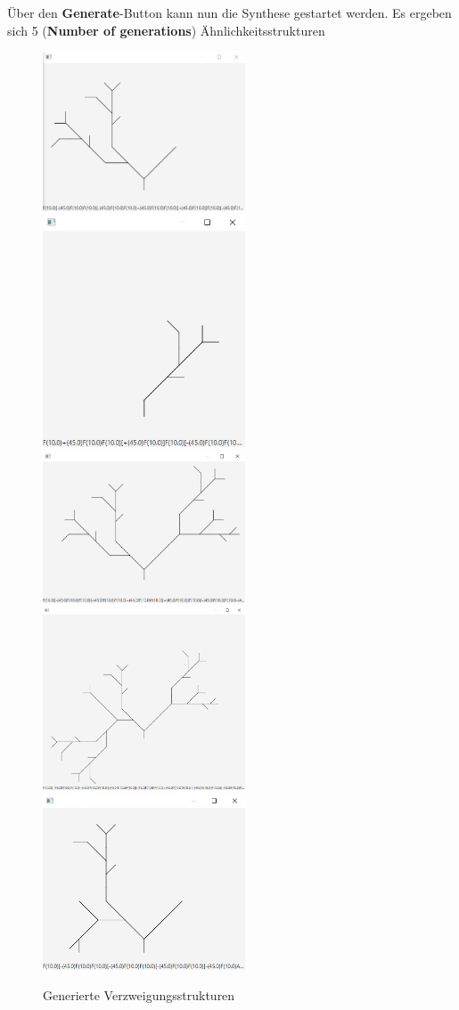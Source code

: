Über den \textbf{Generate}-Button kann nun die Synthese gestartet werden.
Es ergeben sich 5 (\textbf{Number of generations}) Ähnlichkeitsstrukturen

\begin{figure}[H]
    \includegraphics[width=6cm]{../images/example_1.png}
    \includegraphics[width=6cm]{../images/example_2.png}
    \includegraphics[width=6cm]{../images/example_3.png}
    \includegraphics[width=6cm]{../images/example_4.png}
    \includegraphics[width=6cm]{../images/example_5.png}
    \caption{Generierte Verzweigungsstrukturen}
\end{figure}

